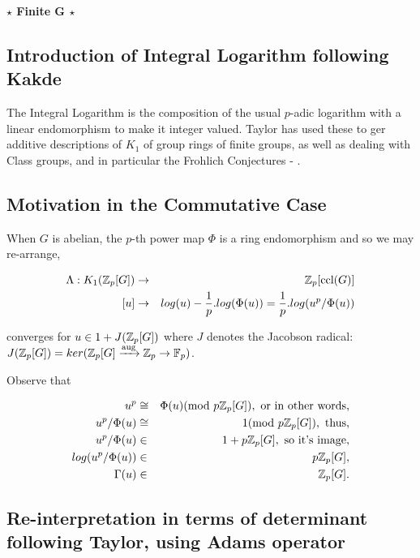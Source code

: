 \textbf{$\star$ Finite G $\star$}
\subsection{Introduction of Integral Logarithm following Kakde}
The Integral Logarithm is the composition of the usual $p$-adic logarithm with a linear endomorphism to make it integer valued. Taylor has used these to ger additive descriptions of $K_1$ of group rings of finite groups, as well as dealing with Class groups, and in particular the Frohlich Conjectures - \cite{roggenkamp1992gra}.

\subsection{Motivation in the Commutative Case}

When $G$ is abelian, the $p$-th power map $\Phi$ is a ring endomorphism and so we may re-arrange,

\begin{eqnarray}
\nonumber \Lambda: K_1(\mathbb Z_p[G]) &\rightarrow& \mathbb Z_p[\text{ccl(} G)]\\
\nonumber [u]                                    &\rightarrow& log(u)-\frac{1}{p}. log(\Phi(u)) = \frac{1}{p} . log (u^p / \Phi(u))
\end{eqnarray}

converges for $u\in 1+J(\mathbb Z_p[G])$ where $J$ denotes the Jacobson radical: $J(\mathbb Z_p[G]) = ker(\mathbb Z_p[G] \xrightarrow{\text{aug}} \mathbb Z_p \rightarrow \mathbb F_p)$.

Observe that 

\begin{eqnarray} 
\nonumber   	u^p &\cong& \Phi(u) (\text{mod }p\mathbb Z_p [G]), \text{ or in other words,}\\
\nonumber        u^p/ \Phi(u) & \cong& 1 (\text{mod }p\mathbb Z_p [G]), \text{ thus,}\\
\nonumber        u^p/ \Phi(u)  &\in&  1 + p\mathbb Z_p [G], \text{ so it's image},\\
\nonumber        log(u^p/ \Phi(u)) &\in& p\mathbb Z_p[G], \\
\nonumber        \Gamma(u) &\in&  \mathbb Z_p[G].
\end{eqnarray}

\subsection{Re-interpretation in terms of determinant following Taylor, using Adams operator}
